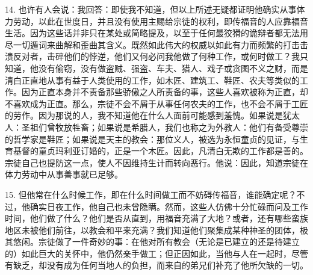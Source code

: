 14. 也许有人会说：我回答：即使我不知道，但以上所述无疑都证明他确实从事体力劳动，以此在世度日，并且没有使用主赐给宗徒的权利，即传福音的人应靠福音生活。因为这些话并非只在某处或简略提及，以至于任何最狡猾的诡辩者都无法用尽一切遁词来曲解和歪曲其含义。既然如此伟大的权威以如此有力而频繁的打击击溃反对者，击碎他们的悖逆，他们又何必问我他做了何种工作，或何时做工？我只知道，他没有偷窃，没有做盗贼、强盗、车夫、猎人、戏子或贪图不义之财，而是清白正直地从事有益于人类使用的工作，如木匠、建筑工、鞋匠、农夫等类似的工作。因为正直本身并不责备那些骄傲之人所责备的事，这些人喜欢被称为正直，却不喜欢成为正直。那么，宗徒不会不屑于从事任何农夫的工作，也不会不屑于工匠的劳作。因为那说的人，我不知道他在什么人面前可能感到羞愧。如果说是犹太人：圣祖们曾牧放牲畜；如果说是希腊人，我们也称之为外教人：他们有备受尊崇的哲学家是鞋匠；如果说是天主的教会：那位义人，被选为永恒童贞的见证，与生育基督的童贞玛利亚订婚的，正是一个木匠。因此，凡清白无欺的工作都是善的。宗徒自己也提防这一点，使人不因维持生计而转向恶行。他说：因此，知道宗徒在体力劳动中从事善事就已足够。\par

15. 但他常在什么时候工作，即在什么时间做工而不妨碍传福音，谁能确定呢？不过，他确实日夜工作，他自己也未曾隐瞒。然而，这些人仿佛十分忙碌而问及工作时间，他们做了什么？他们是否从直到，用福音充满了大地？或者，还有哪些蛮族地区未被他们前往，以教会和平来充满？我们知道他们聚集成某种神圣的团体，极其悠闲。宗徒做了一件奇妙的事：在他对所有教会（无论是已建立的还是待建立的）如此巨大的关怀中，他仍然亲手做工；但正因如此，当他与人在一起时，尽管有缺乏，却没有成为任何当地人的负担，而来自的弟兄们补充了他所欠缺的一切。\par

